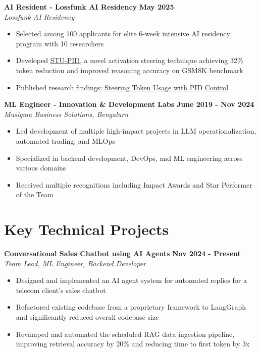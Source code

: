 \documentclass[11pt]{article}
\begin{document}
\textbf{AI Resident - Lossfunk AI Residency} \hfill \textbf{May 2025} \\
\textit{Lossfunk AI Residency}
\begin{itemize}[leftmargin=*, nosep]
\item Selected among 100 applicants for elite 6-week intensive AI residency program with 10 researchers
\item Developed \href{https://github.com/rokosbasilisk/STU-PID}{STU-PID}, a novel activation steering technique achieving 32\% token reduction and improved reasoning accuracy on GSM8K benchmark
\item Published research findings: \href{https://arxiv.org/abs/2506.18831}{Steering Token Usage with PID Control}
\end{itemize}

\textbf{ML Engineer - Innovation \& Development Labs} \hfill \textbf{June 2019 - Nov 2024} \\
\textit{Musigma Business Solutions, Bengaluru}
\begin{itemize}[leftmargin=*, nosep]
\item Led development of multiple high-impact projects in LLM operationalization, automated trading, and MLOps
\item Specialized in backend development, DevOps, and ML engineering across various domains
\item Received multiple recognitions including Impact Awards and Star Performer of the Team
\end{itemize}

\section{Key Technical Projects}

\textbf{Conversational Sales Chatbot using AI Agents} \hfill \textbf{Nov 2024 - Present} \\
\textit{Team Lead, ML Engineer, Backend Developer}
\begin{itemize}[leftmargin=*, nosep]
\item Designed and implemented an AI agent system for automated replies for a telecom client's sales chatbot
\item Refactored existing codebase from a proprietary framework to LangGraph and significantly reduced overall codebase size
\item Revamped and automated the scheduled RAG data ingestion pipeline, improving retrieval accuracy by 20\% and reducing time to first token by 3x
\end{itemize}
\end{document}
